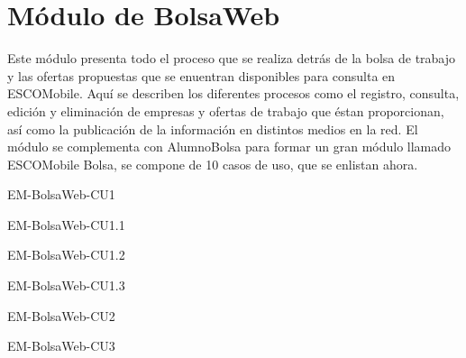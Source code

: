 \section{Módulo de BolsaWeb}

\noindent
Este módulo presenta todo el proceso que se realiza detrás de la bolsa de trabajo y las ofertas 
propuestas que se enuentran disponibles para consulta en ESCOMobile. Aquí se describen los diferentes
procesos como el registro, consulta, edición y eliminación de empresas y ofertas de trabajo que
éstan proporcionan, así como la publicación de la información en distintos medios en la red.
El módulo se complementa con AlumnoBolsa para formar un gran módulo llamado ESCOMobile Bolsa,
se compone de 10 casos de uso, que se enlistan ahora. 

\begin{requisitos}{EM-BolsaWeb-CU1}
\end{requisitos}

\begin{requisitos}{EM-BolsaWeb-CU1.1}
\end{requisitos}

\begin{requisitos}{EM-BolsaWeb-CU1.2}
\end{requisitos}

\begin{requisitos}{EM-BolsaWeb-CU1.3}
\end{requisitos}

\begin{requisitos}{EM-BolsaWeb-CU2}
\end{requisitos}

\begin{requisitos}{EM-BolsaWeb-CU3}
\end{requisitos}

